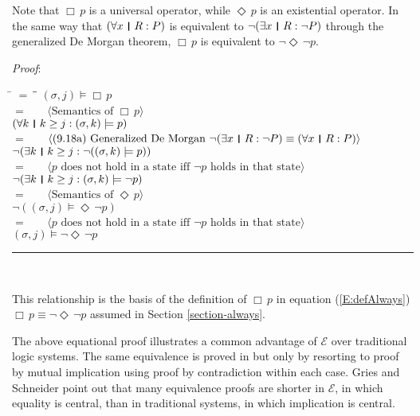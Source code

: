 \documentclass[12pt, fleqn, leqno]{article}
\newcommand{\lgap}{2pt}                             %
\newcommand{\mymathindent}{24pt}                    %
\newcommand{\Event}{\Diamond\,}
\newcommand{\Always}{\Box\,}
\newcommand{\myqed}{\rule[-.23ex]{1.2ex}{2.0ex}}
\newcommand{\myqedtab}{\hspace{384pt}}              %
\newcommand{\thedr}{\rule[-.25ex]{.32mm}{1.75ex}}   %
\newcommand{\dr}{\;\,\thedr\,\;}                    %
\newcommand{\rb}{:}                                 %
\newcommand{\all}{\forall}                          %
\newcommand{\ext}{\exists}                          %
\newcommand{\Gll} {\langle}                         %
\newcommand{\Ggg} {\rangle}                         %
\newcommand{\Hint}[1]     {\ \ \ $\Gll              \mbox{#1} \Ggg$ }   %
\begin{document}
Note that $\Always p$ is a universal operator, while $\Event p$ is an existential operator.
In the same way that $(\all x\dr R\rb P)$ is equivalent to $\neg (\ext x\dr R\rb \neg P)$ through the generalized De Morgan theorem, $\Always p$ is equivalent to $\neg\Event\neg p$.

\emph{Proof}:
\begin{tabbing}
\hspace{\mymathindent} \= $= \;$ \= \myqedtab \= \kill
	\> \>   $(\sigma, j) \models \Always p$\\[\lgap]
	\> $=$  \>  \Hint{Semantics of $\Always p$}\\[\lgap]
	\> \>   $(\all k \dr k \ge j \rb (\sigma,k) \models p)$\\[\lgap]
	\> $=$  \>  \Hint{(9.18a) Generalized De Morgan $\neg (\ext x\dr R\rb \neg P)\equiv (\all x\dr R\rb P)$}\\[\lgap]
	\> \>   $\neg (\ext k \dr k \ge j \rb \neg((\sigma,k) \models p))$\\[\lgap]
	\> $=$  \>  \Hint{$p$ does not hold in a state iff $\neg p$ holds in that state}\\[\lgap]
	\> \>   $\neg (\ext k \dr k \ge j \rb (\sigma,k) \models \neg p)$\\[\lgap]
	\> $=$  \>  \Hint{Semantics of $\Event p$}\\[\lgap]
	\> \>   $\neg ((\sigma, j) \models \Event \neg p)$\\[\lgap]
	\> $=$  \>  \Hint{$p$ does not hold in a state iff $\neg p$ holds in that state}\\[\lgap]
	\> \>   $(\sigma, j) \models \neg \Event \neg p$ \quad \myqed\\
\end{tabbing}
This relationship is the basis of the definition of $\Always p$ in equation (\ref{E:defAlways})
$\Always p \equiv \neg\Event\neg p$ assumed in Section \ref{section-always}.

The above equational proof illustrates a common advantage of $\mathcal{E}$ over traditional logic systems.
The same equivalence is proved in \cite{Ben} but only by resorting to proof by mutual implication using proof by contradiction within each case.
Gries and Schneider \cite{LADM} point out that many equivalence proofs are shorter in $\mathcal{E}$, in which equality is central, than in traditional systems, in which implication is central.
\end{document}
